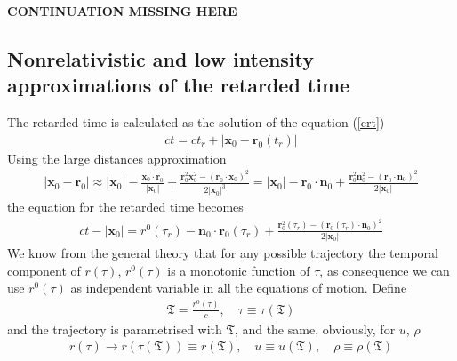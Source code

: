 {\bf{\color{red} CONTINUATION MISSING HERE}}


\subsection{Nonrelativistic and low intensity approximations of the retarded time}




The retarded time is calculated as the solution of the equation (\ref{crt})
\begin{align}
    ct=  ct_r+|{\bm x}_0-{\bm r}_0(t_r)|
\end{align}
Using the large distances approximation
\begin{align}
    |{\bm x}_0-{\bm r}_0|\approx |{\bm x}_0|-\frac{{\bm x}_0\cdot{\bm r}_0}{|{\bm x}_0|}+\frac{{\bm r}_0^2{\bm x}_0^2-({\bm r}_0\cdot{\bm x}_0)^2}{2|{\bm x}_0|^3}=
    |{\bm x}_0|-{{\bm r}_0\cdot{\bm n}_0}+\frac{{\bm r}_0^2{\bm n}_0^2-({\bm r}_0\cdot{\bm n}_0)^2}{2|{\bm x}_0|}
\end{align}
the equation for the retarded time becomes
\begin{align}
    ct-|{\bm x}_0| = r^0(\tau_r)-{\bm n}_0\cdot{\bm r}_0(\tau_r)+\frac{{\bm r}_0^2(\tau_r)-({\bm r}_0(\tau_r)\cdot{\bm n}_0)^2}{2|{\bm x}_0|}
\end{align}
We know from the general theory that  for any possible trajectory the temporal component of $r(\tau)$, $r^0(\tau)$ is a monotonic function of $\tau$, as consequence we can use $r^0(\tau)$ as independent variable in all the equations of motion.
Define
\begin{align}
    {\mathfrak T} = \frac{r^0(\tau)}c,\quad \tau\equiv \tau({\mathfrak T})
\end{align}
and the trajectory is parametrised with ${\mathfrak T}$, and the same, obviously, for $u$, $\rho$
\begin{align}
    r(\tau)\rightarrow r(\tau({\mathfrak T})) \equiv r(\mathfrak T),\quad u\equiv u({\mathfrak T}),\quad \rho\equiv\rho({\mathfrak T})
\end{align}


